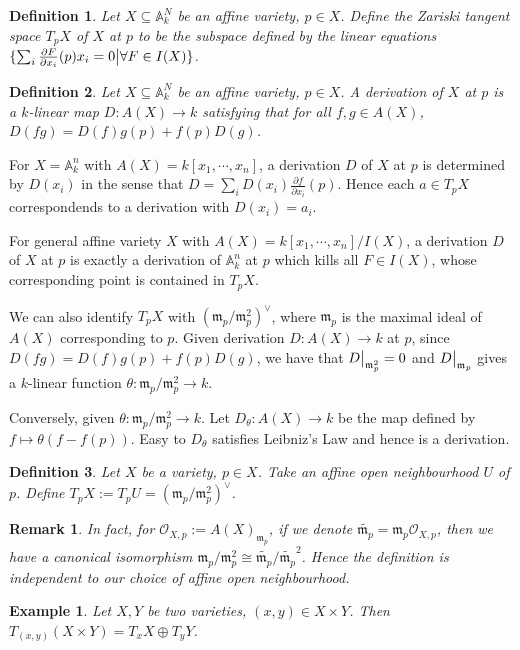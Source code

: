 \documentclass{ctexart}
\newtheorem{definition}{Definition}[section]
\newtheorem{remark}{Remark}[section]
\newtheorem{example}{Example}[section]
\begin{document}
\begin{definition}
    Let $X \subseteq \mathbb{A}_{k}^{N}$ be an affine variety, $p\in X$.
    Define the Zariski tangent space $T_{p}X$ of $X$ at $p$ to be the subspace defined by the linear equations $\{\sum_{i} \frac{\partial F}{\partial x_{i}}(p)x_{i} = 0 \big{|} \forall F\in I(X)\}$.
\end{definition}
\begin{definition}
    Let $X \subseteq \mathbb{A}_{k}^{N}$ be an affine variety, $p\in X$.
    A derivation of $X$ at $p$ is a $k$-linear map $D: A(X) \rightarrow k$ satisfying that for all $f,g\in A(X)$, $D(fg) = D(f)g(p) + f(p)D(g)$.
\end{definition}
For $X = \mathbb{A}_{k}^{n}$ with $A(X) = k[x_{1}, \cdots, x_{n}]$,
a derivation $D$ of $X$ at $p$ is determined by $D(x_{i})$ in the sense that $D = \sum_{i} D(x_{i})\frac{\partial f}{\partial x_{i}}(p)$.
Hence each $a\in T_{p}X$ correspondends to a derivation with $D(x_{i}) = a_{i}$.
\par
For general affine variety $X$ with $A(X) = k[x_{1}, \cdots, x_{n}]/I(X)$, 
a derivation $D$ of $X$ at $p$ is exactly a derivation of $\mathbb{A}_{k}^{n}$ at $p$ which kills all $F\in I(X)$,
whose corresponding point is contained in $T_{p}X$. 
\par
We can also identify $T_{p}X$ with $(\mathfrak{m}_{p}/\mathfrak{m}_{p}^{2})^{\vee}$,
where $\mathfrak{m}_{p}$ is the maximal ideal of $A(X)$ corresponding to $p$.
Given derivation $D: A(X) \rightarrow k$ at $p$, since $D(fg) = D(f)g(p) + f(p)D(g)$, 
we have that $D\big{|}_{\mathfrak{m}_{p}^{2}} = 0$ and $D\big{|}_{\mathfrak{m}_{p}}$ gives a $k$-linear function $\theta: \mathfrak{m}_{p}/\mathfrak{m}_{p}^{2} \rightarrow k$.
\par
Conversely, given $\theta: \mathfrak{m}_{p}/\mathfrak{m}_{p}^{2} \rightarrow k$.
Let $D_{\theta}: A(X) \rightarrow k$ be the map defined by $f \mapsto \theta(f - f(p))$.
Easy to $D_{\theta}$ satisfies Leibniz's Law and hence is a derivation.
\begin{definition}
    Let $X$ be a variety, $p\in X$.
    Take an affine open neighbourhood $U$ of $p$.
    Define $T_{p}X := T_{p}U = (\mathfrak{m}_{p}/\mathfrak{m}_{p}^{2})^{\vee}$.
\end{definition}
\begin{remark}
    In fact, for $\mathcal{O}_{X, p} := A(X)_{\mathfrak{m}_{p}}$,
    if we denote $\widetilde{\mathfrak{m}_{p}} = \mathfrak{m}_{p}\mathcal{O}_{X, p}$,
    then we have a canonical isomorphism $\mathfrak{m}_{p}/\mathfrak{m}_{p}^{2} \cong \widetilde{\mathfrak{m}_{p}}/\widetilde{\mathfrak{m}_{p}}^{2}$.
    Hence the definition is independent to our choice of affine open neighbourhood.
\end{remark}
\begin{example}
    Let $X, Y$ be two varieties, $(x, y)\in X \times Y$.
    Then $T_{(x, y)}(X \times Y) = T_{x}X \oplus T_{y}Y$.
\end{example}
\end{document}
